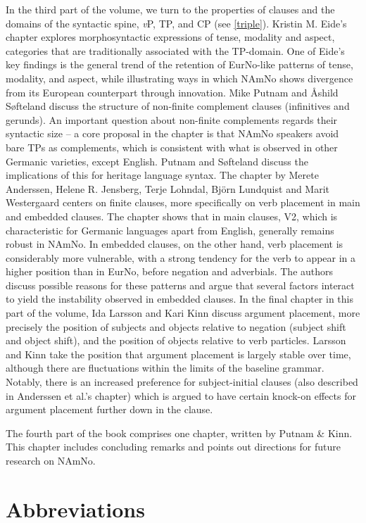 \documentclass[output=paper,colorlinks,citecolor=brown]{langscibook}
\begin{document}
In the third part of the volume, we turn to the properties of clauses and the domains of the syntactic spine, \emph{v}P, TP, and CP (see \ref{triple}). Kristin M. Eide's chapter explores morphosyntactic expressions of tense, modality and aspect, categories that are traditionally associated with the TP-domain. One of Eide's key findings is the general trend of the retention of EurNo-like patterns of tense, modality, and aspect, while illustrating ways in which NAmNo shows divergence from its European counterpart through innovation. Mike Putnam and Åshild Søfteland discuss the structure of non-finite complement clauses (infinitives and gerunds). An important question about non-finite complements regards their syntactic size -- a core proposal in the chapter is that NAmNo speakers avoid bare TPs as complements, which is consistent with what is observed in other Germanic varieties, except English. Putnam and Søfteland discuss the implications of this for heritage language syntax.  The chapter by Merete Anderssen, Helene R. Jensberg, Terje Lohndal, Björn Lundquist and Marit Westergaard centers on finite clauses, more specifically on verb placement in main and embedded clauses. The chapter shows that in main clauses, V2, which is characteristic for Germanic languages apart from English, generally remains robust in NAmNo. In embedded clauses, on the other hand, verb placement is considerably more vulnerable, with a strong tendency for the verb to appear in a higher position than in EurNo, before negation and adverbials. The authors discuss possible reasons for these patterns and argue that several factors interact to yield the instability observed in embedded clauses. In the final chapter in this part of the volume, Ida Larsson and Kari Kinn discuss argument placement, more precisely the position of subjects and objects relative to negation (subject shift and object shift), and the position of objects relative to verb particles. Larsson and Kinn take the position that argument placement is largely stable over time, although there are fluctuations within the limits of the baseline grammar. Notably, there is an increased preference for subject-initial clauses (also described in Anderssen et al.'s chapter) which is argued to have certain knock-on effects for argument placement further down in the clause. 

The fourth part of the book comprises one chapter, written by Putnam \& Kinn. This chapter includes concluding remarks and points out directions for future research on NAmNo. 

\section*{Abbreviations}
\end{document}
